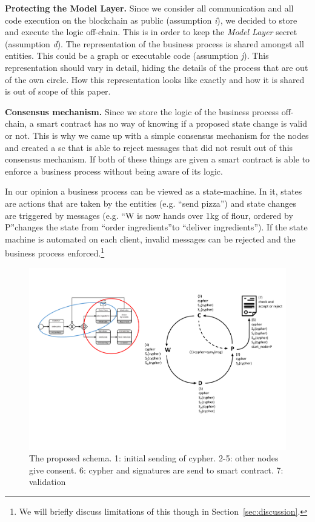 \documentclass[runningheads]{llncs}
\newcommand{\ber}[1]{\textit{#1}}
\newcommand{\refsec}[1]{Section~\ref{#1}}
\renewcommand{\bigbreak}{}
\newcommand{\quotel}{``}
\newcommand{\quoter}{''}
\begin{document}
\bigbreak
\textbf{Protecting the Model Layer.} Since we consider all communication and all code execution on the blockchain as public (assumption \ber{i}), we decided to store and execute the logic off-chain. This is in order to keep the \ber{Model Layer} secret (assumption \ber{d}). The representation of the business process is shared amongst all entities. This could be a graph or executable code (assumption \ber{j}). This representation should vary in detail, hiding the details of the process that are out of the own circle. How this representation looks like exactly and how it is shared is out of scope of this paper.


\bigbreak
\textbf{Consensus mechanism.} Since we store the logic of the business process off-chain, a smart contract has no way of knowing if a proposed state change is valid or not. This is why we came up with a simple consensus mechanism for the nodes and created a sc that is able to reject messages that did not result out of this consensus mechanism. If both of these things are given a smart contract is able to enforce a business process without being aware of its logic. 

In our opinion a business process can be viewed as a state-machine. In it, states are actions that are taken by the entities (e.g. \quotel send pizza\quoter ) and state changes are triggered by messages (e.g. \quotel W is now hands over 1kg of flour, ordered by P\quoter  changes the state from \quotel order ingredients\quoter to \quotel deliver ingredients\quoter ). If the state machine is automated on each client, invalid messages can be rejected and the business process enforced.\footnote{We will briefly discuss limitations of this though in \refsec{sec:discussion}.}

\begin{center}
\begin{figure}
    \centering
    \includegraphics[trim=13cm 4cm 0cm 3cm,clip=true,scale=0.5]{schema.pdf}
    \caption{The proposed schema. 1: initial sending of cypher. 2-5: other nodes give consent. 6: cypher and signatures are send to smart contract. 7: validation} 
    \label{fig:schema}
\end{figure}
\end{center}
\end{document}
